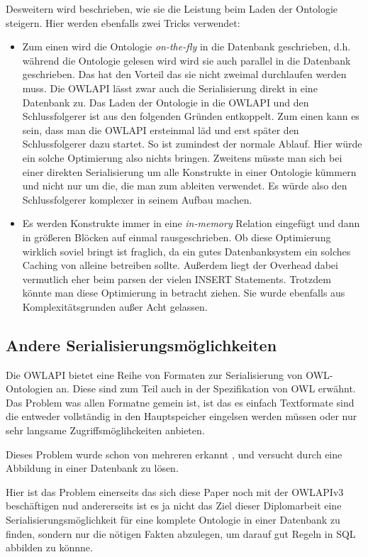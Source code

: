 Desweitern wird beschrieben, wie sie die Leistung beim Laden der Ontologie steigern. Hier werden ebenfalls zwei Tricks verwendet:
\begin{itemize}
  \item Zum einen wird die Ontologie \emph{on-the-fly} in die Datenbank geschrieben, d.h. während die Ontologie gelesen wird wird sie auch parallel in die Datenbank geschrieben. Das hat den Vorteil das sie nicht zweimal durchlaufen werden muss. Die OWLAPI lässt zwar auch die Serialisierung direkt in eine Datenbank zu. Das Laden der Ontologie in die OWLAPI und den Schlussfolgerer ist aus den folgenden Gründen entkoppelt. Zum einen kann es sein, dass man die OWLAPI ersteinmal läd und erst später den Schlussfolgerer dazu startet. So ist zumindest der normale Ablauf. Hier würde ein solche Optimierung also nichts bringen. Zweitens müsste man sich bei einer direkten Serialisierung um alle Konstrukte in einer Ontologie kümmern und nicht nur um die, die man zum ableiten verwendet. Es würde also den Schlussfolgerer komplexer in seinem Aufbau machen.
  \item Es werden Konstrukte immer in eine \emph{in-memory} Relation eingefügt und dann in größeren Blöcken auf einmal rausgeschrieben. Ob diese Optimierung wirklich soviel bringt ist fraglich, da ein gutes Datenbanksystem ein solches Caching von alleine betreiben sollte. Außerdem liegt der Overhead dabei vermutlich eher beim parsen der vielen INSERT Statements. Trotzdem könnte man diese Optimierung in betracht ziehen. Sie wurde ebenfalls aus Komplexitätsgrunden außer Acht gelassen.
\end{itemize}

\subsection{Andere Serialisierungsmöglichkeiten}
Die OWLAPI bietet eine Reihe von Formaten zur Serialisierung von OWL-Ontologien an. Diese sind zum Teil auch in der Spezifikation von OWL erwähnt. Das Problem was allen Formatne gemein ist, ist das es einfach Textformate sind die entweder vollständig in den Hauptspeicher eingelsen werden müssen oder nur sehr langsame Zugriffsmöglihckeiten anbieten.

Dieses Problem wurde schon von mehreren erkannt \cite{Kleb2009ProtegeDB}, \cite{Kleb2009OWLDB} und versucht durch eine Abbildung in einer Datenbank zu lösen.

Hier ist das Problem einerseits das sich diese Paper noch mit der OWLAPIv3 beschäftigen nud andererseits ist es ja nicht das Ziel dieser Diplomarbeit  eine Serialisierungsmöglichkeit für eine komplete Ontologie in einer Datenbank zu finden, sondern nur die nötigen Fakten abzulegen, um darauf gut Regeln in SQL abbilden zu könnne.